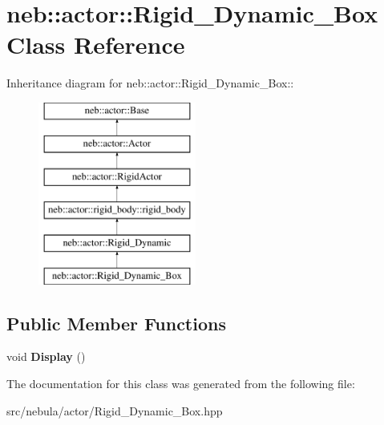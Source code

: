 \hypertarget{classneb_1_1actor_1_1Rigid__Dynamic__Box}{
\section{neb::actor::Rigid\_\-Dynamic\_\-Box Class Reference}
\label{classneb_1_1actor_1_1Rigid__Dynamic__Box}
}
Inheritance diagram for neb::actor::Rigid\_\-Dynamic\_\-Box::\begin{figure}[H]
\begin{center}
\leavevmode
\includegraphics[height=6cm]{classneb_1_1actor_1_1Rigid__Dynamic__Box}
\end{center}
\end{figure}
\subsection*{Public Member Functions}
\begin{DoxyCompactItemize}
\item 
\hypertarget{classneb_1_1actor_1_1Rigid__Dynamic__Box_ad2564e54df3b07cc2454ba28a026b765}{
void {\bfseries Display} ()}
\label{classneb_1_1actor_1_1Rigid__Dynamic__Box_ad2564e54df3b07cc2454ba28a026b765}

\end{DoxyCompactItemize}


The documentation for this class was generated from the following file:\begin{DoxyCompactItemize}
\item 
src/nebula/actor/Rigid\_\-Dynamic\_\-Box.hpp\end{DoxyCompactItemize}

